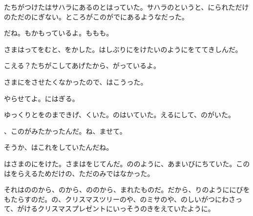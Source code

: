たちがつけたはサハラにあるのとはっていた。サハラのというと、にられただけのただのにぎない。ところがこのがでにあるようなだった。

だね。もかもっているよ。ももも。

さまはってをむと、をかした。はしぶりにをけたいのようにをててきしんだ。

こえる？たちがこしてあげたから、がっているよ。

さまにをさせたくなかったので、はこうった。

やらせてよ。にはぎる。

ゆっくりとをのまできげ、くいた。のはいていた。えるにして、のがいた。

、このがみたかったんだ。ね、ませて。

そうか、はこれをしていたんだね。

はさまのにをけた。さまはをじてんだ。ののように、あまいびにちていた。このはをらえるためだけの、ただのみではなかった。

それはののから、のから、ののから、まれたものだ。だから、りのようににびをもたらすのだ。の、クリスマスツリーのや、のミサのや、のしいがつにわさって、がけるクリスマスプレゼントにいっそうのきをえていたように。

